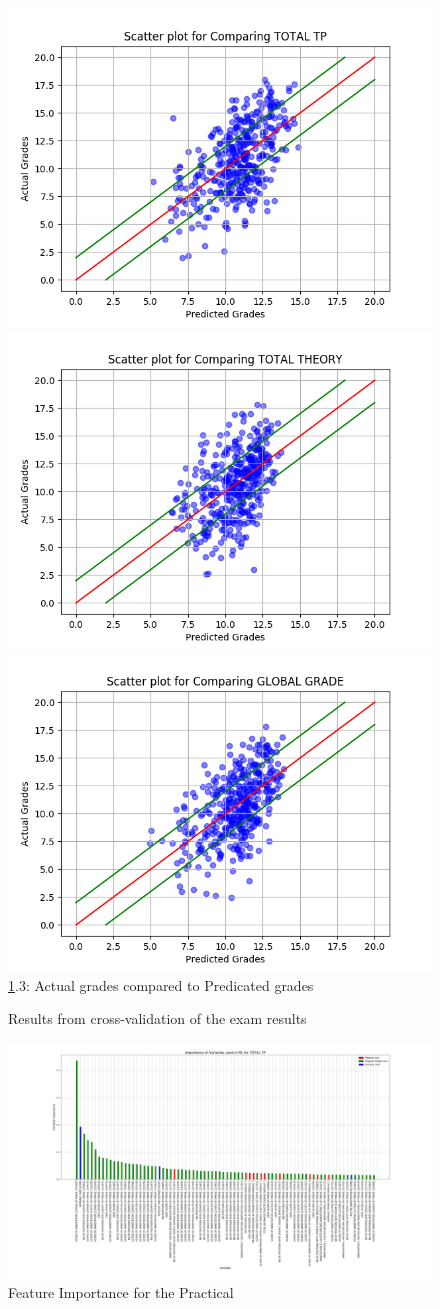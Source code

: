 \documentclass[a4paper,11pt]{report}
\numberwithin{figure}{section} %
\begin{document}
\begin{figure}[H]
      \includegraphics[width=.30\linewidth]{cv_comp_TOTAL_TP_2018-04-27_19_24_46.png}
      \includegraphics[width=.30\linewidth]{cv_comp_TOTAL_THEORY_2018-04-30_13_53_15.png}
  	  \includegraphics[width=.30\linewidth]{cv_comp_GLOBAL_GRADE_2018-04-30_13_48_59.png}
      \\
      \ref{fig:results_tot}.3: Actual grades compared to Predicated grades
      \caption{Results from cross-validation of the exam results}
      \label{fig:results_tot}
    \end{figure}
    
    
      \begin{figure}[H]
      \centering
      \includegraphics[width=.95\linewidth]{var_importance_TOTAL_TP_2018-04-29_14_37_37.png}
      \caption{Feature Importance for the Practical}
      \label{fig:var_tot1}
      \end{figure}
      
\end{document}
